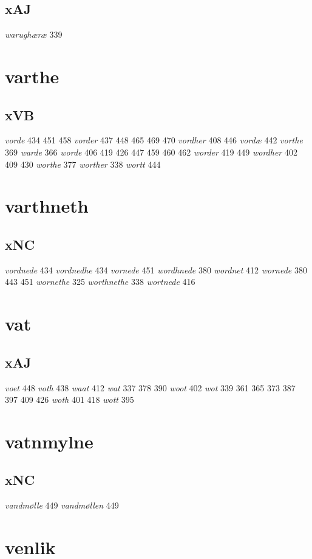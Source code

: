 \documentclass[a4paper,twocolumn]{article}
\begin{document}
\subsection{xAJ}
\label{sec:orga1103f4}
\emph{warughæræ} 339 
\section{varthe}
\label{sec:org12a7391}
\subsection{xVB}
\label{sec:orge3ceeda}
\emph{vorde} 434 451 458 \emph{vorder} 437 448 465 469 470 \emph{vordher} 408 446 \emph{vordæ} 442 \emph{vorthe} 369 \emph{warde} 366 \emph{worde} 406 419 426 447 459 460 462 \emph{worder} 419 449 \emph{wordher} 402 409 430 \emph{worthe} 377 \emph{worther} 338 \emph{wortt} 444 
\section{varthneth}
\label{sec:orgc26e03b}
\subsection{xNC}
\label{sec:org3c411b3}
\emph{vordnede} 434 \emph{vordnedhe} 434 \emph{vornede} 451 \emph{wordhnede} 380 \emph{wordnet} 412 \emph{wornede} 380 443 451 \emph{wornethe} 325 \emph{worthnethe} 338 \emph{wortnede} 416 
\section{vat}
\label{sec:orge6a9d8d}
\subsection{xAJ}
\label{sec:orge72335d}
\emph{voet} 448 \emph{voth} 438 \emph{waat} 412 \emph{wat} 337 378 390 \emph{woot} 402 \emph{wot} 339 361 365 373 387 397 409 426 \emph{woth} 401 418 \emph{wott} 395 
\section{vatnmylne}
\label{sec:orga7fec23}
\subsection{xNC}
\label{sec:orgd865686}
\emph{vandmølle} 449 \emph{vandmøllen} 449 
\section{venlik}
\label{sec:org6aad499}
\end{document}
